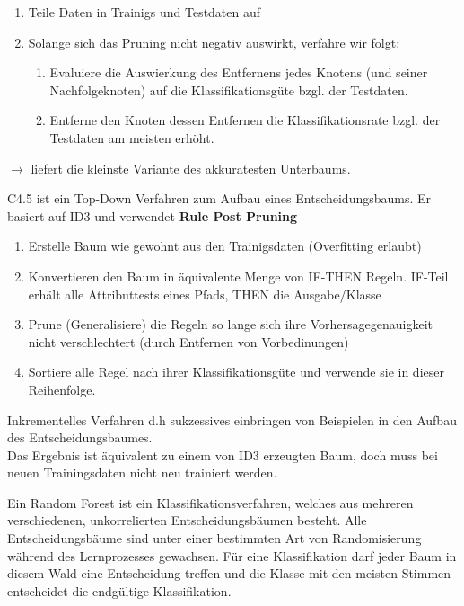 \begin{enumerate}
    \item Teile Daten in Trainigs und Testdaten auf
    \item Solange sich das Pruning nicht negativ auswirkt, verfahre wir folgt:
    \begin{enumerate}
        \item Evaluiere die Auswierkung des Entfernens jedes Knotens (und seiner
        Nachfolgeknoten) auf die Klassifikationsgüte bzgl. der Testdaten.
        \item Entferne den Knoten dessen Entfernen die Klassifikationsrate bzgl.
        der Testdaten am meisten erhöht.
    \end{enumerate}
\end{enumerate}
$\rightarrow$ liefert die kleinste Variante des akkuratesten Unterbaums.

C4.5 ist ein Top-Down Verfahren zum Aufbau eines Entscheidungsbaums. Er basiert
auf ID3 und verwendet \textbf{Rule Post Pruning}

\begin{enumerate}
    \item Erstelle Baum wie gewohnt aus den Trainigsdaten (Overfitting erlaubt)
    \item Konvertieren den Baum in äquivalente Menge von IF-THEN Regeln. IF-Teil
    erhält alle Attributtests eines Pfads, THEN die Ausgabe/Klasse
    \item Prune (Generalisiere) die Regeln so lange sich ihre Vorhersagegenauigkeit
    nicht verschlechtert (durch Entfernen von Vorbedinungen)
    \item Sortiere alle Regel nach ihrer Klassifikationsgüte und verwende
    sie in dieser Reihenfolge.
\end{enumerate}
Inkrementelles Verfahren d.h sukzessives einbringen von Beispielen
in den Aufbau des Entscheidungsbaumes. \\
Das Ergebnis ist äquivalent zu einem von ID3 erzeugten Baum, doch muss bei neuen
Trainingsdaten nicht neu trainiert werden.

Ein Random Forest ist ein Klassifikationsverfahren, welches aus mehreren
  verschiedenen, unkorrelierten Entscheidungsbäumen besteht. Alle
  Entscheidungsbäume sind unter einer bestimmten Art von Randomisierung während
  des Lernprozesses gewachsen. Für eine Klassifikation darf jeder Baum in
  diesem Wald eine Entscheidung treffen und die Klasse mit den meisten Stimmen
  entscheidet die endgültige Klassifikation.
